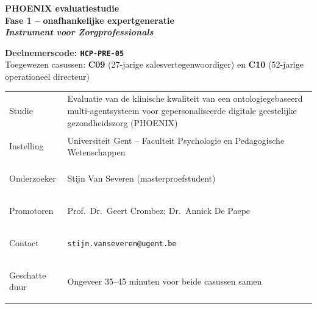 \documentclass[11pt,a4paper]{article}
\renewcommand{\arraystretch}{1.28}
\begin{document}
\thispagestyle{fancy}
\vspace*{0.3cm}

\begin{tcolorbox}[
  colback=DarkBlue,colframe=DarkBlue,
  arc=3mm,left=14pt,right=14pt,top=12pt,bottom=12pt,
  width=\textwidth
]
\centering
{\fontsize{22}{28}\selectfont\bfseries\color{white}
PHOENIX evaluatiestudie\\[0.3em]
\fontsize{15}{20}\selectfont\color{AccentBlue}
Fase 1 -- onafhankelijke expertgeneratie\\[0.2em]
\fontsize{12}{16}\selectfont\color{white}
\textit{Instrument voor Zorgprofessionals}
}
\end{tcolorbox}

\vspace{0.6cm}

\begin{center}
\begin{tcolorbox}[
  colback=AccentBlue,colframe=PrimaryBlue,
  arc=2.5mm,boxrule=1.2pt,left=12pt,right=12pt,top=10pt,bottom=10pt,
  width=0.86\textwidth
]
\centering
{\large\bfseries\color{DarkBlue}Deelnemerscode: \texttt{HCP-PRE-05}}\\[0.5em]
{\normalsize\color{SlateMid}
Toegewezen casussen:\quad
\textbf{\color{PrimaryBlue}C09} (27-jarige salesvertegenwoordiger)
\quad en \quad
\textbf{\color{PrimaryBlue}C10} (52-jarige operationeel directeur)
}
\end{tcolorbox}
\end{center}

\vspace{0.5cm}

\begin{center}
\begin{tcolorbox}[
  colback=SoftBG,colframe=BorderGrey,
  arc=2mm,left=10pt,right=10pt,top=9pt,bottom=9pt,
  width=0.92\textwidth
]
\small\renewcommand{\arraystretch}{1.28}
\begin{tabularx}{\textwidth}{@{}>{\bfseries\raggedright\arraybackslash}p{}X@{}}
Studie & Evaluatie van de klinische kwaliteit van een ontologiegebaseerd multi-agentsysteem voor gepersonaliseerde digitale geestelijke gezondheidszorg (PHOENIX) \\
Instelling & Universiteit Gent -- Faculteit Psychologie en Pedagogische Wetenschappen \\
Onderzoeker & Stijn Van Severen (masterproefstudent) \\
Promotoren & Prof.\ Dr.\ Geert Crombez; Dr.\ Annick De Paepe \\
Contact & \texttt{stijn.vanseveren@ugent.be} \\
Geschatte duur & Ongeveer 35--45 minuten voor beide casussen samen \\
\end{tabularx}
\end{tcolorbox}
\end{center}
\end{document}
